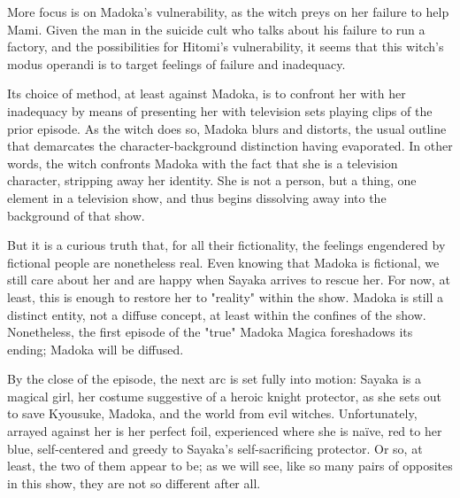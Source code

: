 More focus is on Madoka's vulnerability, as the witch preys on her failure to help Mami. Given the man in the suicide cult who talks about his failure to run a factory, and the possibilities for Hitomi's vulnerability, it seems that this witch's modus operandi is to target feelings of failure and inadequacy.

Its choice of method, at least against Madoka, is to confront her with her inadequacy by means of presenting her with television sets playing clips of the prior episode. As the witch does so, Madoka blurs and distorts, the usual outline that demarcates the character-background distinction having evaporated. In other words, the witch confronts Madoka with the fact that she is a television character, stripping away her identity. She is not a person, but a thing, one element in a television show, and thus begins dissolving away into the background of that show.

But it is a curious truth that, for all their fictionality, the feelings engendered by fictional people are nonetheless real. Even knowing that Madoka is fictional, we still care about her and are happy when Sayaka arrives to rescue her. For now, at least, this is enough to restore her to "reality" within the show. Madoka is still a distinct entity, not a diffuse concept, at least within the confines of the show. Nonetheless, the first episode of the "true" Madoka Magica foreshadows its ending; Madoka will be diffused.

By the close of the episode, the next arc is set fully into motion: Sayaka is a magical girl, her costume suggestive of a heroic knight protector, as she sets out to save Kyousuke, Madoka, and the world from evil witches. Unfortunately, arrayed against her is her perfect foil, experienced where she is naïve, red to her blue, self-centered and greedy to Sayaka's self-sacrificing protector. Or so, at least, the two of them appear to be; as we will see, like so many pairs of opposites in this show, they are not so different after all.
